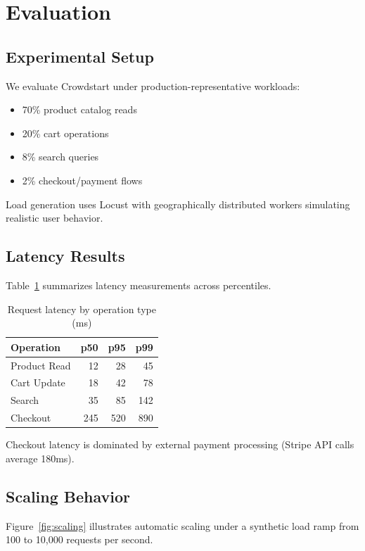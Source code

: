 \section{Evaluation}


\subsection{Experimental Setup}

We evaluate Crowdstart under production-representative workloads:

\begin{itemize}
\item 70\% product catalog reads
\item 20\% cart operations
\item 8\% search queries
\item 2\% checkout/payment flows
\end{itemize}

Load generation uses Locust with geographically distributed workers simulating realistic user behavior.

\subsection{Latency Results}

Table~\ref{tab:latency} summarizes latency measurements across percentiles.

\begin{table}[h]
\centering
\caption{Request latency by operation type (ms)}
\label{tab:latency}
\begin{tabular}{lrrr}
\hline
Operation & p50 & p95 & p99 \\
\hline
Product Read & 12 & 28 & 45 \\
Cart Update & 18 & 42 & 78 \\
Search & 35 & 85 & 142 \\
Checkout & 245 & 520 & 890 \\
\hline
\end{tabular}
\end{table}

Checkout latency is dominated by external payment processing (Stripe API calls average 180ms).

\subsection{Scaling Behavior}

Figure~\ref{fig:scaling} illustrates automatic scaling under a synthetic load ramp from 100 to 10,000 requests per second.


